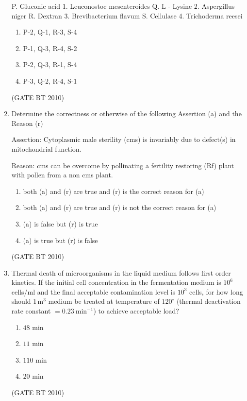 \documentclass[journal,12pt,onecolumn]{IEEEtran}
\theoremstyle{remark}
\begin{document}
\begin{enumerate}
P. Gluconic acid \hspace{3.1cm} 1. Leuconostoc mesenteroides
Q. L - Lysine \hspace{4.2cm} 2. Aspergillus niger
R. Dextran \hspace{4.5cm} 3. Brevibacterium flavum
S. Cellulase \hspace{4.3cm} 4. Trichoderma reesei

\begin{enumerate}
   \item P-2, Q-1, R-3, S-4
   \item P-1, Q-3, R-4, S-2
   \item P-2, Q-3, R-1, S-4
   \item P-3, Q-2, R-4, S-1
\end{enumerate}
\hfill (GATE BT 2010)

\item Determine the correctness or otherwise of the following Assertion (a) and the Reason (r)

Assertion: Cytoplasmic male sterility (cms) is invariably due to defect(s) in mitochondrial function.

Reason: cms can be overcome by pollinating a fertility restoring (Rf) plant with pollen from a non cms plant.

\begin{enumerate}
  \item both (a) and (r) are true and (r) is the correct reason for (a)
  \item both (a) and (r) are true and (r) is not the correct reason for (a)
  \item (a) is false but (r) is true
  \item (a) is true but (r) is false
\end{enumerate}
\hfill (GATE BT 2010)

\item Thermal death of microorganisms in the liquid medium follows first order kinetics. If the initial cell concentration in the fermentation medium is $10^{6}$ cells/ml and the final acceptable contamination level is $10^{3}$ cells, for how long should $1\,\mathrm{m}^{3}$ medium be treated at temperature of $120^{\circ}$ (thermal deactivation rate constant $= 0.23\ \mathrm{min}^{-1}$) to achieve acceptable load?

\begin{enumerate}
   \item $48$ min
   \item $11$ min
   \item $110$ min
   \item $20$ min
\end{enumerate}
\hfill (GATE BT 2010)


\end{enumerate}
\end{document}
